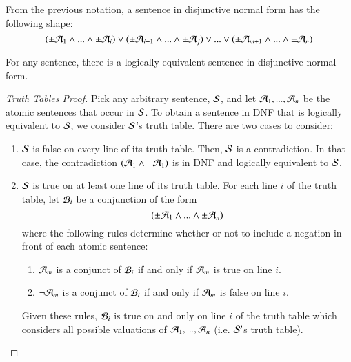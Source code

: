 \begin{remark}
    From the previous notation, a sentence in disjunctive normal form has the following shape: \begin{equation*}
        (\pm\mathcal{A}_1\wedge ...\wedge\pm\mathcal{A}_i)\vee(\pm\mathcal{A}_{i+1}\wedge ...\wedge\pm\mathcal{A}_j)\vee...\vee(\pm\mathcal{A}_{m+1}\wedge ...\wedge\pm\mathcal{A}_n)
    \end{equation*}
\end{remark}

\begin{theorem}
    For any sentence, there is a logically equivalent sentence in disjunctive normal form.
\end{theorem}
\begin{proof}[Truth Tables Proof]
    Pick any arbitrary sentence, $\mathcal{S}$, and let $\mathcal{A}_1,...,\mathcal{A}_n$ be the atomic sentences that occur in $\mathcal{S}$. To obtain a sentence in DNF that is logically equivalent to $\mathcal{S}$, we consider $\mathcal{S}$'s truth table. There are two cases to consider: \begin{enumerate}
        \item $\mathcal{S}$ is false on every line of its truth table. Then, $\mathcal{S}$ is a contradiction. In that case, the contradiction $(\mathcal{A}_1\wedge\neg\mathcal{A}_1)$ is in DNF and logically equivalent to $\mathcal{S}$.
        \item $\mathcal{S}$ is true on at least one line of its truth table. For each line $i$ of the truth table, let $\mathcal{B}_i$ be a conjunction of the form \begin{equation*}
                (\pm\mathcal{A}_1\wedge...\wedge\pm\mathcal{A}_n)
        \end{equation*}
            where the following rules determine whether or not to include a negation in front of each atomic sentence: \begin{enumerate}
                \item $\mathcal{A}_m$ is a conjunct of $\mathcal{B}_i$ if and only if $\mathcal{A}_m$ is true on line $i$.
                \item $\neg \mathcal{A}_m$ is a conjunct of $\mathcal{B}_i$ if and only if $\mathcal{A}_m$ is false on line $i$.
            \end{enumerate}
            Given these rules, $\mathcal{B}_i$ is true on and only on line $i$ of the truth table which considers all possible valuations of $\mathcal{A}_1,...,\mathcal{A}_n$ (i.e. $\mathcal{S}'$s truth table).


\end{enumerate}
\end{proof}
